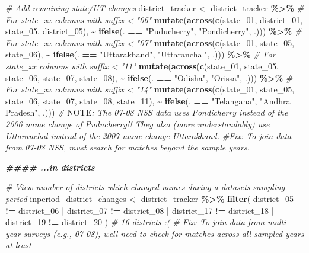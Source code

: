 \documentclass[
]{article}
\newenvironment{Shaded}{\begin{snugshade}}{\end{snugshade}}
\newcommand{\AlertTok}[1]{\textcolor[rgb]{0.94,0.16,0.16}{#1}}
\newcommand{\CommentTok}[1]{\textcolor[rgb]{0.56,0.35,0.01}{\textit{#1}}}
\newcommand{\DocumentationTok}[1]{\textcolor[rgb]{0.56,0.35,0.01}{\textbf{\textit{#1}}}}
\newcommand{\FunctionTok}[1]{\textcolor[rgb]{0.13,0.29,0.53}{\textbf{#1}}}
\newcommand{\NormalTok}[1]{#1}
\newcommand{\OtherTok}[1]{\textcolor[rgb]{0.56,0.35,0.01}{#1}}
\newcommand{\SpecialCharTok}[1]{\textcolor[rgb]{0.81,0.36,0.00}{\textbf{#1}}}
\newcommand{\StringTok}[1]{\textcolor[rgb]{0.31,0.60,0.02}{#1}}
\begin{document}
\begin{Shaded}
\begin{Highlighting}[]
\CommentTok{\# Add remaining state/UT changes}
\NormalTok{district\_tracker }\OtherTok{\textless{}{-}}\NormalTok{ district\_tracker }\SpecialCharTok{\%\textgreater{}\%}
  \CommentTok{\# For state\_xx columns with suffix \textless{} "06"}
  \FunctionTok{mutate}\NormalTok{(}\FunctionTok{across}\NormalTok{(}\FunctionTok{c}\NormalTok{(state\_01, district\_01, state\_05, district\_05), }
                \SpecialCharTok{\textasciitilde{}} \FunctionTok{ifelse}\NormalTok{(. }\SpecialCharTok{==} \StringTok{"Puducherry"}\NormalTok{, }\StringTok{"Pondicherry"}\NormalTok{, .))) }\SpecialCharTok{\%\textgreater{}\%}
  \CommentTok{\# For state\_xx columns with suffix \textless{} "07"}
  \FunctionTok{mutate}\NormalTok{(}\FunctionTok{across}\NormalTok{(}\FunctionTok{c}\NormalTok{(state\_01, state\_05, state\_06), }
                \SpecialCharTok{\textasciitilde{}} \FunctionTok{ifelse}\NormalTok{(. }\SpecialCharTok{==} \StringTok{"Uttarakhand"}\NormalTok{, }\StringTok{"Uttaranchal"}\NormalTok{, .))) }\SpecialCharTok{\%\textgreater{}\%}
  \CommentTok{\# For state\_xx columns with suffix \textless{} "11"}
  \FunctionTok{mutate}\NormalTok{(}\FunctionTok{across}\NormalTok{(}\FunctionTok{c}\NormalTok{(state\_01, state\_05, state\_06, state\_07, state\_08), }
                \SpecialCharTok{\textasciitilde{}} \FunctionTok{ifelse}\NormalTok{(. }\SpecialCharTok{==} \StringTok{"Odisha"}\NormalTok{, }\StringTok{"Orissa"}\NormalTok{, .))) }\SpecialCharTok{\%\textgreater{}\%}
  \CommentTok{\# For state\_xx columns with suffix \textless{} "14"}
  \FunctionTok{mutate}\NormalTok{(}\FunctionTok{across}\NormalTok{(}\FunctionTok{c}\NormalTok{(state\_01, state\_05, state\_06, state\_07, state\_08, state\_11), }
                \SpecialCharTok{\textasciitilde{}} \FunctionTok{ifelse}\NormalTok{(. }\SpecialCharTok{==} \StringTok{"Telangana"}\NormalTok{, }\StringTok{"Andhra Pradesh"}\NormalTok{, .)))}
\CommentTok{\# }\AlertTok{NOTE}\CommentTok{: The 07{-}08 NSS data uses Pondicherry instead of the 2006 name change of Puducherry!! They also (more understandably) use Uttaranchal instead of the 2007 name change Uttarakhand. }
\CommentTok{\#Fix: To join data from 07{-}08 NSS, must search for matches beyond the sample years.}


\DocumentationTok{\#\#\#\# ...in districts}

\CommentTok{\# View number of districts which changed names during a dataset\textquotesingle{}s sampling period}
\NormalTok{inperiod\_district\_changes }\OtherTok{\textless{}{-}}\NormalTok{ district\_tracker }\SpecialCharTok{\%\textgreater{}\%} 
  \FunctionTok{filter}\NormalTok{(}
\NormalTok{    district\_05 }\SpecialCharTok{!=}\NormalTok{ district\_06 }\SpecialCharTok{|}
\NormalTok{    district\_07 }\SpecialCharTok{!=}\NormalTok{ district\_08 }\SpecialCharTok{|}
\NormalTok{    district\_17 }\SpecialCharTok{!=}\NormalTok{ district\_18 }\SpecialCharTok{|}
\NormalTok{    district\_19 }\SpecialCharTok{!=}\NormalTok{ district\_20}
\NormalTok{  )}
\CommentTok{\# 16 districts :(}
\CommentTok{\# Fix: To join data from multi{-}year surveys (e.g., 07{-}08), we\textquotesingle{}ll need to check for matches across all sampled years at least}




\end{Highlighting}
\end{Shaded}
\end{document}
